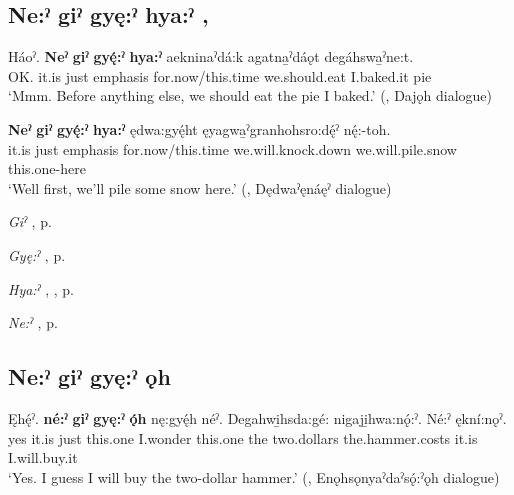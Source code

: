 \subsection*{\textbf{Ne:ˀ giˀ gyę:ˀ hya:ˀ} , } \label{p:[ne:ˀ giˀ gyę:ˀ hya:ˀ]}

\ea
\label{ex:npar58}
\gll Háoˀ. \textbf{Neˀ} \textbf{giˀ} \textbf{gyę́:ˀ} \textbf{hya:ˀ} aekninaˀdá:k agatna̱ˀdáǫt degáhswa̱ˀne:t.\\
OK. it.is just emphasis for.now/this.time we.should.eat I.baked.it pie\\
\glt ‘Mmm. Before anything else, we should eat the pie I baked.’ (\cite[376]{mithun_watewayestanih_1984}, Dajǫh dialogue)
\z

\ea
\label{ex:npar59}
\gll \textbf{Neˀ} \textbf{giˀ} \textbf{gyę́:ˀ} \textbf{hya:ˀ}  ędwa:gyę́ht ęyagwa̱ˀgranhohsro:dę́ˀ nę́:-toh.\\
it.is just emphasis for.now/this.time we.will.knock.down we.will.pile.snow this.one-here\\
\glt ‘Well first, we’ll pile some snow here.’ (\cite[481]{mithun_watewayestanih_1984}, Dędwaˀęnáęˀ dialogue)
\z

\begin{CayugaRelated}
\item \textit{Giˀ} , p. \pageref{p:[giˀ]}\\
\item \textit{Gyę:ˀ} , p. \pageref{p:[gyę:ˀ]}\\
\item \textit{Hya:ˀ} , , p. \pageref{p:[hya:ˀ]}\\
\item \textit{Ne:ˀ} , p. \pageref{p:[ne:ˀ] `it is’}
\end{CayugaRelated}

\subsection*{\textbf{Ne:ˀ giˀ gyę:ˀ ǫh} } \label{p:[ne:ˀ giˀ gyę:ˀ ǫh]}

\ea
\label{ex:npar60}
\gll Ęhę́ˀ. \textbf{né:ˀ} \textbf{giˀ} \textbf{gyę:ˀ} \textbf{ǫ́h} nę:gyę́h néˀ. Degahwi̱hsda:gé: nigaji̱hwa:nǫ́:ˀ. Né:ˀ ękní:nǫˀ.\\
yes it.is just this.one I.wonder this.one the two.dollars the.hammer.costs it.is I.will.buy.it\\
\glt ‘Yes. I guess I will buy the two-dollar hammer.’ (\cite[158]{mithun_watewayestanih_1984}, Enǫhsǫnyaˀdaˀsǫ́:ˀǫh dialogue)
\z

